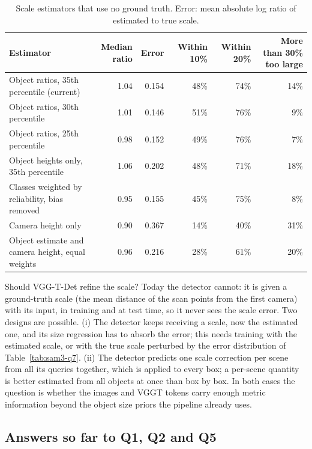 \begin{table}[t]
\centering
\caption{Scale estimators that use no ground truth. Error: mean absolute log ratio of estimated to true scale.}
\label{tab:sam3-q7b}
\begin{tabular}{lrrrrr}
\toprule
Estimator & Median ratio & Error & Within 10\% & Within 20\% & More than 30\% too large \\
\midrule
Object ratios, 35th percentile (current)          & 1.04 & 0.154 & 48\% & 74\% & 14\% \\
Object ratios, 30th percentile                    & 1.01 & 0.146 & 51\% & 76\% &  9\% \\
Object ratios, 25th percentile                    & 0.98 & 0.152 & 49\% & 76\% &  7\% \\
Object heights only, 35th percentile              & 1.06 & 0.202 & 48\% & 71\% & 18\% \\
Classes weighted by reliability, bias removed     & 0.95 & 0.155 & 45\% & 75\% &  8\% \\
Camera height only                                & 0.90 & 0.367 & 14\% & 40\% & 31\% \\
Object estimate and camera height, equal weights  & 0.96 & 0.216 & 28\% & 61\% & 20\% \\
\bottomrule
\end{tabular}
\end{table}

Should VGG-T-Det refine the scale? Today the detector cannot: it is given a ground-truth scale (the mean distance
of the scan points from the first camera) with its input, in training and at test time, so it never sees the
scale error. Two designs are possible. (i) The detector keeps receiving a scale, now the estimated one, and its
size regression has to absorb the error; this needs training with the estimated scale, or with the true scale
perturbed by the error distribution of Table~\ref{tab:sam3-q7}. (ii) The detector predicts one scale correction
per scene from all its queries together, which is applied to every box; a per-scene quantity is better
estimated from all objects at once than box by box. In both cases the question is whether the images and VGGT
tokens carry enough metric information beyond the object size priors the pipeline already uses.


\subsection{Answers so far to Q1, Q2 and Q5}
\label{sec:sam3-answers}

